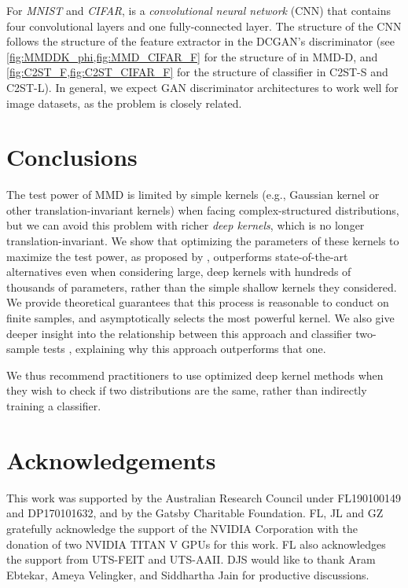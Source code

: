\documentclass{article}
\begin{document}
For \emph{MNIST} and \emph{CIFAR},  is a \emph{convolutional neural network} (CNN) that contains four convolutional layers and one fully-connected layer.
The structure of the CNN follows the structure of the feature extractor in the DCGAN's discriminator \citep{DCGAN_Radford} (see \cref{fig:MMDDK_phi,fig:MMD_CIFAR_F} for the structure of  in MMD-D, and \cref{fig:C2ST_F,fig:C2ST_CIFAR_F} for the structure of classifier  in C2ST-S and C2ST-L).
In general, we expect GAN discriminator architectures to work well for image datasets,
as the problem is closely related.







\section{Conclusions}
The test power of MMD is limited by simple kernels (e.g., Gaussian kernel or other translation-invariant kernels) when facing complex-structured distributions,
but we can avoid this problem with richer \emph{deep kernels}, which is no longer translation-invariant.
We show that optimizing the parameters of these kernels to maximize the test power,
as proposed by \citet{sutherland:mmd-opt},
outperforms state-of-the-art alternatives
even when considering large, deep kernels with hundreds of thousands of parameters,
rather than the simple shallow kernels they considered.
We provide theoretical guarantees that this process is reasonable to conduct on finite samples, and asymptotically selects the most powerful kernel.
We also give deeper insight into the relationship between this approach and classifier two-sample tests \citep{Lopez:C2ST},
explaining why this approach outperforms that one.

We thus recommend practitioners to use optimized deep kernel methods when they wish to check if two distributions are the same, rather than indirectly training a classifier.

\ifdefined\isaccepted
\section*{Acknowledgements}
This work was supported by the Australian Research Council under FL190100149 and DP170101632, and
by the Gatsby Charitable Foundation.
FL, JL and GZ gratefully acknowledge the support of the NVIDIA Corporation with the donation of two NVIDIA TITAN V GPUs for this work. FL also acknowledges the support from UTS-FEIT and UTS-AAII.
DJS would like to thank Aram Ebtekar, Ameya Velingker, and Siddhartha Jain for productive discussions.
\fi
\end{document}
